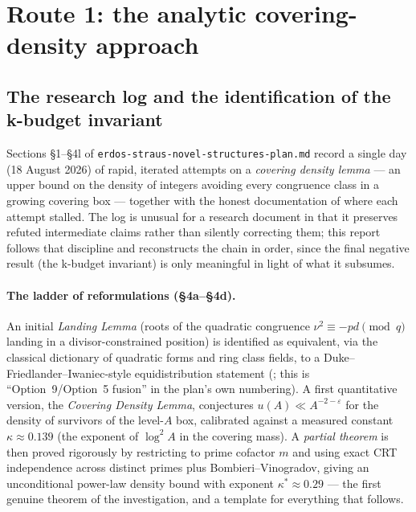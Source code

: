 \documentclass[11pt]{article}
\theoremstyle{plain}
\theoremstyle{definition}
\theoremstyle{remark}
\renewcommand{\_}{\textunderscore\allowbreak}
\begin{document}
\section{Route 1: the analytic covering-density approach}
\label{sec:route1}

\subsection{The research log and the identification of the k-budget invariant}
\label{subsec:kbudget}

Sections \S1--\S4l of \texttt{erdos-\allowbreak straus-\allowbreak novel-\allowbreak structures-\allowbreak plan.md} record a single day (18
August 2026) of rapid, iterated attempts on a \emph{covering density lemma} — an upper bound on
the density of integers avoiding every congruence class in a growing covering box — together
with the honest documentation of where each attempt stalled. The log is unusual for a research
document in that it preserves refuted intermediate claims rather than silently correcting them;
this report follows that discipline and reconstructs the chain in order, since the final
negative result (the k-budget invariant) is only meaningful in light of what it subsumes.

\paragraph{The ladder of reformulations (\S4a--\S4d).}
An initial \emph{Landing Lemma} (roots of the quadratic congruence $\nu^2\equiv -pd\pmod q$
landing in a divisor-constrained position) is identified as equivalent, via the classical
dictionary of quadratic forms and ring class fields, to a Duke--Friedlander--Iwaniec-style
equidistribution statement (\cite{DFI}; this is ``Option~9/Option~5 fusion'' in the plan's own
numbering). A first quantitative version, the \emph{Covering Density Lemma}, conjectures
$u(A)\ll A^{-2-\varepsilon}$ for the density of survivors of the level-$A$ box, calibrated
against a measured constant $\kappa\approx0.139$ (the exponent of $\log^2A$ in the covering
mass). A \emph{partial theorem} is then proved rigorously by restricting to prime cofactor $m$
and using exact CRT independence across distinct primes plus Bombieri--Vinogradov, giving an
unconditional power-law density bound with exponent $\kappa^*\approx0.29$ — the first genuine
theorem of the investigation, and a template for everything that follows.
\end{document}
